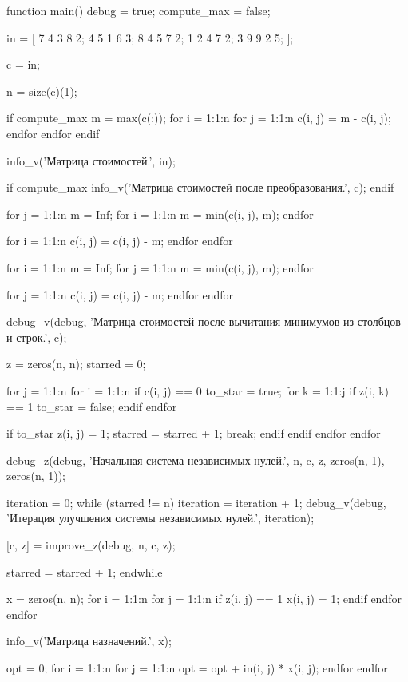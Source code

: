 function main()
  debug = true;
  compute_max = false;

  in = [
  7 4 3 8 2;
  4 5 1 6 3;
  8 4 5 7 2;
  1 2 4 7 2;
  3 9 9 2 5;
  ];

  c = in;

  n = size(c)(1);

  if compute_max
    m = max(c(:));
    for i = 1:1:n
      for j = 1:1:n
        c(i, j) = m - c(i, j);
      endfor
    endfor
  endif

  info_v('Матрица стоимостей.', in);

  if compute_max
    info_v('Матрица стоимостей после преобразования.', c);
  endif

  for j = 1:1:n
    m = Inf;
    for i = 1:1:n
      m = min(c(i, j), m);
    endfor

    for i = 1:1:n
      c(i, j) = c(i, j) - m;
    endfor
  endfor

  for i = 1:1:n
    m = Inf;
    for j = 1:1:n
      m = min(c(i, j), m);
    endfor

    for j = 1:1:n
      c(i, j) = c(i, j) - m;
    endfor
  endfor

  debug_v(debug, 'Матрица стоимостей после вычитания минимумов из столбцов и строк.', c);

  z = zeros(n, n);
  starred = 0;

  for j = 1:1:n
    for i = 1:1:n
      if c(i, j) == 0
        to_star = true;
        for k = 1:1:j
          if z(i, k) == 1
            to_star = false;
          endif
        endfor

        if to_star
          z(i, j) = 1;
          starred = starred + 1;
          break;
        endif
      endif
    endfor
  endfor

  debug_z(debug, 'Начальная система независимых нулей.', n, c, z, zeros(n, 1), zeros(n, 1));

  iteration = 0;
  while (starred != n)
    iteration = iteration + 1;
    debug_v(debug, 'Итерация улучшения системы независимых нулей.', iteration);

    [c, z] = improve_z(debug, n, c, z);

    starred = starred + 1;
  endwhile

  x = zeros(n, n);
  for i = 1:1:n
    for j = 1:1:n
      if z(i, j) == 1
        x(i, j) = 1;
      endif
    endfor
  endfor

  info_v('Матрица назначений.', x);

  opt = 0;
  for i = 1:1:n
    for j = 1:1:n
      opt = opt + in(i, j) * x(i, j);
    endfor
  endfor

